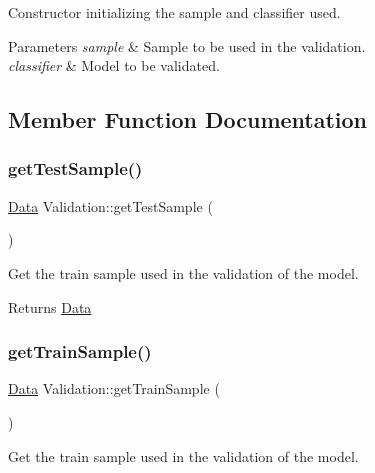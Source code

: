 Constructor initializing the sample and classifier used. 


\begin{DoxyParams}{Parameters}
{\em sample} & Sample to be used in the validation. \\
\hline
{\em classifier} & Model to be validated. \\
\hline
\end{DoxyParams}


\subsection{Member Function Documentation}
\mbox{\label{class_validation_a6ef1b8600535a064b9a94507afdf849c}} 
\subsubsection{\texorpdfstring{get\+Test\+Sample()}{getTestSample()}}
{\footnotesize\ttfamily \hyperlink{class_data}{Data} Validation\+::get\+Test\+Sample (\begin{DoxyParamCaption}{ }\end{DoxyParamCaption})}



Get the train sample used in the validation of the model. 

\begin{DoxyReturn}{Returns}
\hyperlink{class_data}{Data} 
\end{DoxyReturn}
\mbox{\label{class_validation_a656f4919ec48a7f26063d046d583433a}} 
\subsubsection{\texorpdfstring{get\+Train\+Sample()}{getTrainSample()}}
{\footnotesize\ttfamily \hyperlink{class_data}{Data} Validation\+::get\+Train\+Sample (\begin{DoxyParamCaption}{ }\end{DoxyParamCaption})}



Get the train sample used in the validation of the model. 

